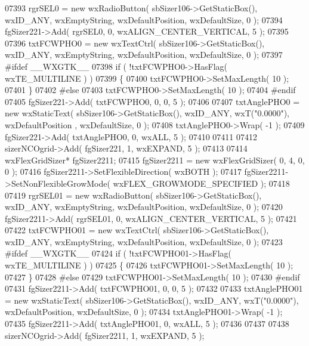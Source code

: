 \begin{DoxyCode}
07393     rgrSEL0 = \textcolor{keyword}{new} wxRadioButton( sbSizer106->GetStaticBox(), wxID\_ANY, wxEmptyString, wxDefaultPosition, 
      wxDefaultSize, 0 );
07394     fgSizer221->Add( rgrSEL0, 0, wxALIGN\_CENTER\_VERTICAL, 5 );
07395     
07396     txtFCWPHO0 = \textcolor{keyword}{new} wxTextCtrl( sbSizer106->GetStaticBox(), wxID\_ANY, wxEmptyString, wxDefaultPosition, 
      wxDefaultSize, 0 );
07397 \textcolor{preprocessor}{    #ifdef \_\_WXGTK\_\_}
07398     \textcolor{keywordflow}{if} ( !txtFCWPHO0->HasFlag( wxTE\_MULTILINE ) )
07399     \{
07400     txtFCWPHO0->SetMaxLength( 10 );
07401     \}
07402 \textcolor{preprocessor}{    #else}
07403     txtFCWPHO0->SetMaxLength( 10 );
07404 \textcolor{preprocessor}{    #endif}
07405     fgSizer221->Add( txtFCWPHO0, 0, 0, 5 );
07406     
07407     txtAnglePHO0 = \textcolor{keyword}{new} wxStaticText( sbSizer106->GetStaticBox(), wxID\_ANY, wxT(\textcolor{stringliteral}{"0.0000"}), wxDefaultPosition
      , wxDefaultSize, 0 );
07408     txtAnglePHO0->Wrap( -1 );
07409     fgSizer221->Add( txtAnglePHO0, 0, wxALL, 5 );
07410     
07411     
07412     sizerNCOgrid->Add( fgSizer221, 1, wxEXPAND, 5 );
07413     
07414     wxFlexGridSizer* fgSizer2211;
07415     fgSizer2211 = \textcolor{keyword}{new} wxFlexGridSizer( 0, 4, 0, 0 );
07416     fgSizer2211->SetFlexibleDirection( wxBOTH );
07417     fgSizer2211->SetNonFlexibleGrowMode( wxFLEX\_GROWMODE\_SPECIFIED );
07418     
07419     rgrSEL01 = \textcolor{keyword}{new} wxRadioButton( sbSizer106->GetStaticBox(), wxID\_ANY, wxEmptyString, wxDefaultPosition, 
      wxDefaultSize, 0 );
07420     fgSizer2211->Add( rgrSEL01, 0, wxALIGN\_CENTER\_VERTICAL, 5 );
07421     
07422     txtFCWPHO01 = \textcolor{keyword}{new} wxTextCtrl( sbSizer106->GetStaticBox(), wxID\_ANY, wxEmptyString, wxDefaultPosition, 
      wxDefaultSize, 0 );
07423 \textcolor{preprocessor}{    #ifdef \_\_WXGTK\_\_}
07424     \textcolor{keywordflow}{if} ( !txtFCWPHO01->HasFlag( wxTE\_MULTILINE ) )
07425     \{
07426     txtFCWPHO01->SetMaxLength( 10 );
07427     \}
07428 \textcolor{preprocessor}{    #else}
07429     txtFCWPHO01->SetMaxLength( 10 );
07430 \textcolor{preprocessor}{    #endif}
07431     fgSizer2211->Add( txtFCWPHO01, 0, 0, 5 );
07432     
07433     txtAnglePHO01 = \textcolor{keyword}{new} wxStaticText( sbSizer106->GetStaticBox(), wxID\_ANY, wxT(\textcolor{stringliteral}{"0.0000"}), 
      wxDefaultPosition, wxDefaultSize, 0 );
07434     txtAnglePHO01->Wrap( -1 );
07435     fgSizer2211->Add( txtAnglePHO01, 0, wxALL, 5 );
07436     
07437     
07438     sizerNCOgrid->Add( fgSizer2211, 1, wxEXPAND, 5 );

\end{DoxyCode}
